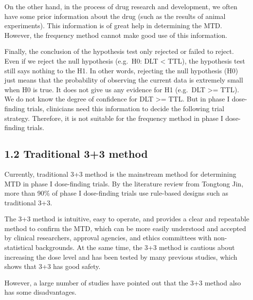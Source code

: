 \documentclass[
]{article}
\begin{document}
On the other hand, in the process of drug research and development, we
often have some prior information about the drug (such as the results of
animal experiments). This information is of great help in determining
the MTD. However, the frequency method cannot make good use of this
information.

Finally, the conclusion of the hypothesis test only rejected or failed
to reject. Even if we reject the null hypothesis (e.g.~H0: DLT
\textless{} TTL), the hypothesis test still says nothing to the H1. In
other words, rejecting the null hypothesis (H0) just means that the
probability of observing the current data is extremely small when H0 is
true. It does not give us any evidence for H1 (e.g.~DLT \textgreater=
TTL). We do not know the degree of confidence for DLT \textgreater= TTL.
But in phase I dose-finding trials, clinicians need this information to
decide the following trial strategy. Therefore, it is not suitable for
the frequency method in phase I dose-finding trials.

\hypertarget{traditional-33-method}{%
\subsection{1.2 Traditional 3+3 method}\label{traditional-33-method}}

Currently, traditional 3+3 method is the mainstream method for
determining MTD in phase I dose-finding trials. By the literature review
from Tongtong Jin, more than 90\% of phase I dose-finding trials use
rule-based designs such as traditional 3+3.

The 3+3 method is intuitive, easy to operate, and provides a clear and
repeatable method to confirm the MTD, which can be more easily
understood and accepted by clinical researchers, approval agencies, and
ethics committees with non-statistical backgrounds. At the same time,
the 3+3 method is cautious about increasing the dose level and has been
tested by many previous studies, which shows that 3+3 has good safety.

However, a large number of studies have pointed out that the 3+3 method
also has some disadvantages.
\end{document}
